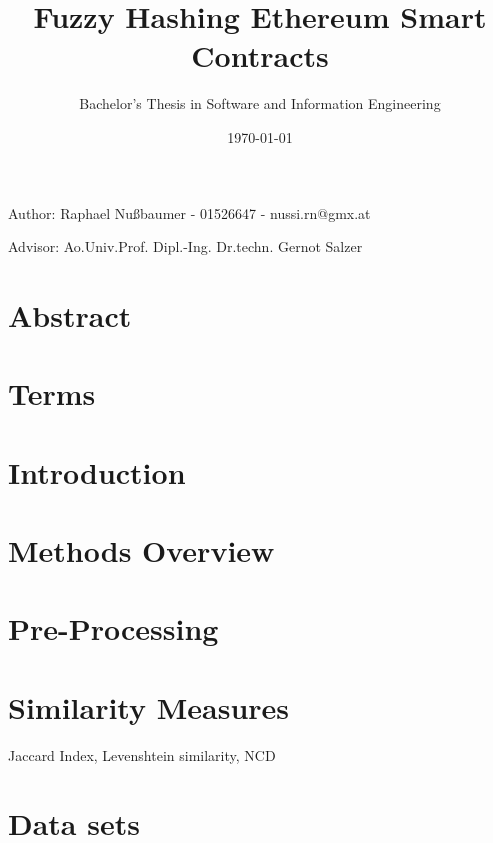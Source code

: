 \documentclass[]{article}
\title{Fuzzy Hashing Ethereum Smart Contracts}
\author{Bachelor's Thesis in Software and Information Engineering}
\date{\today}
\begin{document}
\maketitle
\begin{center}
  Author: Raphael Nußbaumer - 01526647 - nussi.rn@gmx.at

  Advisor: Ao.Univ.Prof. Dipl.-Ing. Dr.techn. Gernot Salzer
\end{center}

\section{Abstract}


\section{Terms}


\section{Introduction}


\section{Methods Overview}


\section{Pre-Processing}


\section{Similarity Measures}

Jaccard Index, Levenshtein similarity, NCD

\section{Data sets}

\end{document}
